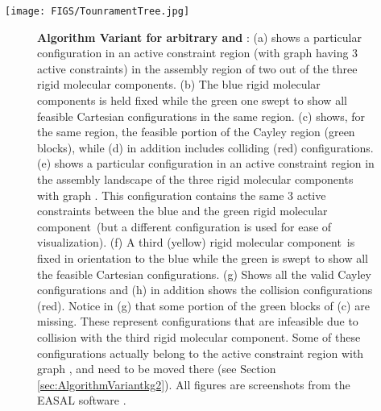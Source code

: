 \documentclass[]{article}
\newcommand{\rmc}{rigid molecular component}
\begin{document}
\begin{figure*}[htpb]
		\texttt{[image: FIGS/TounramentTree.jpg]}
		\caption{Tournament tree showing the assembly of 16 \rmc s,  through
		. The input are the leaves of the tree, the internal nodes adjacent
		to the leaves are atlases generated using the core algorithm. All
		other internal nodes are obtained through a direct sum of its children.
		The root node is the final atlas of all the input \rmc s. 
		See text in Section \ref{sec:AlgorithmVariantkg2}.}
		\label{fig:tournamentTree}
\end{figure*}



\begin{figure}[htbp]
\centering
{}

\caption{ \scriptsize \textbf{Algorithm Variant for arbitrary  and }:
(a) shows a particular configuration in an active constraint region
(with graph  having 3 active constraints)
in the assembly region of two out of the three \rmc s.
(b) The blue \rmc s is held fixed while the green one swept to show
all feasible Cartesian configurations in the same region.
(c) shows, for the same region, the feasible portion of the Cayley region 
(green blocks), while (d) in addition includes colliding (red) configurations. 
(e) shows a particular configuration in an active constraint region
in the assembly landscape of the three \rmc s with graph .
This configuration contains 
the same 3 active constraints between the blue and the green \rmc\ 
(but a different configuration is used for ease of visualization).
(f) A third (yellow) \rmc\ is fixed in orientation to the blue while the green is
swept to show all the feasible Cartesian configurations. 
(g) Shows all the valid Cayley configurations and (h) in addition shows the
collision configurations (red).
Notice in (g) that some portion of the green blocks of (c) are missing. These represent
configurations that are infeasible due to collision with the third \rmc.
Some of these configurations actually belong to the active constraint region with
graph , and need to be moved there
(see Section \ref{sec:AlgorithmVariantkg2}).
All figures are screenshots from the EASAL software 
\cite{easalVideo,easalSoftware,Ozkan:toms}.
}
\label{fig:ss23mol}
\end{figure}
\end{document}

